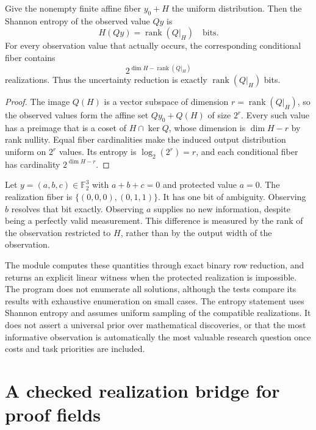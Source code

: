 \begin{PPTtheorem}
\label{PPT:res:23:5}
Give the nonempty finite affine fiber $y_0+H$ the uniform distribution. Then the Shannon entropy of the observed value $Qy$ is
\[
H(Qy)=\operatorname{rank}(Q|_H)\quad\text{bits}.
\]
For every observation value that actually occurs, the corresponding conditional fiber contains
\[
2^{\dim H-\operatorname{rank}(Q|_H)}
\]
realizations. Thus the uncertainty reduction is exactly $\operatorname{rank}(Q|_H)$ bits.
\end{PPTtheorem}
\begin{proof}
The image $Q(H)$ is a vector subspace of dimension $r=\operatorname{rank}(Q|_H)$, so the observed values form the affine set $Qy_0+Q(H)$ of size $2^r$. Every such value has a preimage that is a coset of $H\cap\ker Q$, whose dimension is $\dim H-r$ by rank nullity. Equal fiber cardinalities make the induced output distribution uniform on $2^r$ values. Its entropy is $\log_2(2^r)=r$, and each conditional fiber has cardinality $2^{\dim H-r}$.
\end{proof}

\begin{PPTexample}
\label{PPT:res:23:6}
Let $y=(a,b,c)\in\mathbb F_2^3$ with $a+b+c=0$ and protected value $a=0$. The realization fiber is $\{(0,0,0),(0,1,1)\}$. It has one bit of ambiguity. Observing $b$ resolves that bit exactly. Observing $a$ supplies no new information, despite being a perfectly valid measurement. This difference is measured by the rank of the observation restricted to $H$, rather than by the output width of the observation.
\end{PPTexample}

The module  computes these quantities through exact binary row reduction, and returns an explicit linear witness when the protected realization is impossible. The program does not enumerate all solutions, although the tests compare its results with exhaustive enumeration on small cases. The entropy statement uses Shannon entropy \cite{PPT:cover-thomas} and assumes uniform sampling of the compatible realizations. It does not assert a universal prior over mathematical discoveries, or that the most informative observation is automatically the most valuable research question once costs and task priorities are included.


\section{A checked realization bridge for proof fields}
\label{PPT:sec:old24}
\label{PPT:sec:checked-bridge}

